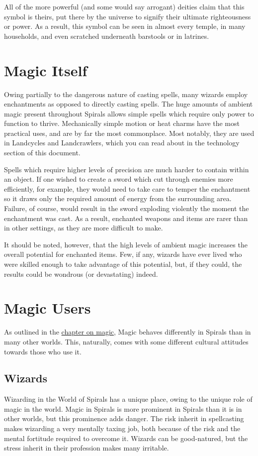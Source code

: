 \begin{multicols}{2}
All of the more powerful (and some would say arrogant) deities claim that this symbol is theirs, put there by the universe to signify their ultimate righteousness or power.
As a result, this symbol can be seen in almost every temple, in many households, and even scratched underneath barstools or in latrines.

\section{Magic Itself}
Owing partially to the dangerous nature of casting spells, many wizards employ enchantments as opposed to directly casting spells.
The huge amounts of ambient magic present throughout Spirals allows simple spells which require only power to function to thrive.
Mechanically simple motion or heat charms have the most practical uses, and are by far the most commonplace.
Most notably, they are used in Landcycles and Landcrawlers, which you can read about in the technology section of this document.

Spells which require higher levels of precision are much harder to contain within an object.
If one wished to create a sword which cut through enemies more efficiently, for example, they would need to take care to temper the enchantment so it draws only the required amount of energy from the surrounding area.
Failure, of course, would result in the sword exploding violently the moment the enchantment was cast.
As a result, enchanted weapons and items are rarer than in other settings, as they are more difficult to make.

It should be noted, however, that the high levels of ambient magic increases the overall potential for enchanted items.
Few, if any, wizards have ever lived who were skilled enough to take advantage of this potential, but, if they could, the results could be wondrous (or devastating) indeed.

\section{Magic Users}
As outlined in the \hyperref[chapter:magic]{chapter on magic}, Magic behaves differently in Spirals than in many other worlds.
This, naturally, comes with some different cultural attitudes towards those who use it.

\subsection{Wizards}
Wizarding in the World of Spirals has a unique place, owing to the unique role of magic in the world.
Magic in Spirals is more prominent in Spirals than it is in other worlds, but this prominence adds danger.
The risk inherit in spellcasting makes wizarding a very mentally taxing job, both because of the risk and the mental fortitude required to overcome it.
Wizards can be good-natured, but the stress inherit in their profession makes many irritable. 


\end{multicols}
